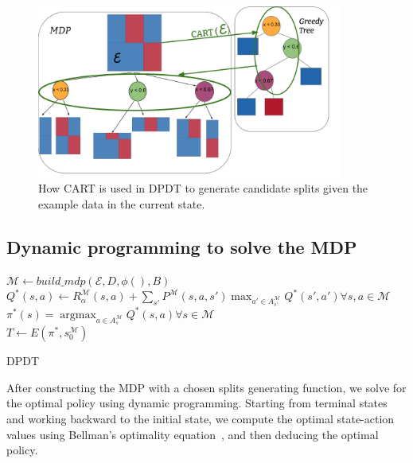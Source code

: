 \begin{figure}
      \centering
      \includegraphics[trim={0 0cm 0 0},clip,width=0.9\textwidth]{images/figures/schematic_cart_node_select.pdf}
      \caption{How CART is used in DPDT to generate candidate splits given the example data in the current state.}\label{fig:schema-dpdt}
\end{figure}



\subsection{Dynamic programming to solve the MDP}
        \begin{algorithm}
            $\mathcal{M} \gets build\_mdp(\mathcal{E}, D, \phi(), B)$\label{line:build_mdp} \\
            $Q^*(s,a) \gets R_{\alpha}^{\mathcal{M}}(s,a) + \sum_{s'} P^{\mathcal{M}}(s,a,s') \max_{a' \in A_{s'}^{\mathcal{M}}} Q^*(s',a') \forall s,a \in \mathcal{M}$\\
            $\pi^*(s) = \operatorname{argmax}_{a \in A_s^{\mathcal{M}}} Q^*(s, a) \forall s \in \mathcal{M} $\\
            $T \gets E(\pi^*,s_0^{\mathcal{M}}) $
            \caption{DPDT}\label{alg:dpdt}
        \end{algorithm}
        
After constructing the MDP with a chosen splits generating function, we solve for the optimal policy using dynamic programming. Starting from terminal states and working backward to the initial state, we compute the optimal state-action values using Bellman's optimality equation~\cite{Bellman}, and then deducing the optimal policy.

